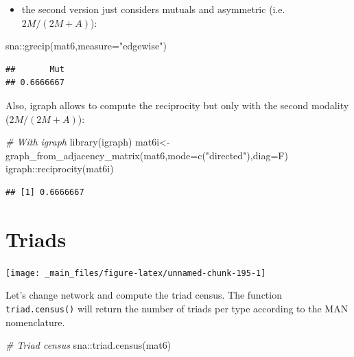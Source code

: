 \documentclass[
  notitlepage,
  onecolumn,
  openany]{book}
\newenvironment{Shaded}{\begin{snugshade}}{\end{snugshade}}
\newcommand{\AttributeTok}[1]{\textcolor[rgb]{0.77,0.63,0.00}{#1}}
\newcommand{\CommentTok}[1]{\textcolor[rgb]{0.56,0.35,0.01}{\textit{#1}}}
\newcommand{\FunctionTok}[1]{\textcolor[rgb]{0.00,0.00,0.00}{#1}}
\newcommand{\NormalTok}[1]{#1}
\newcommand{\OtherTok}[1]{\textcolor[rgb]{0.56,0.35,0.01}{#1}}
\newcommand{\SpecialCharTok}[1]{\textcolor[rgb]{0.00,0.00,0.00}{#1}}
\newcommand{\StringTok}[1]{\textcolor[rgb]{0.31,0.60,0.02}{#1}}
\providecommand{\tightlist}{%
  \setlength{\itemsep}{0pt}\setlength{\parskip}{0pt}}
\begin{document}
\begin{itemize}
\tightlist
\item
  the second version just considers mutuals and asymmetric (i.e.~\(2M/(2M+A)\)):
\end{itemize}

\begin{Shaded}
\begin{Highlighting}[]
\NormalTok{sna}\SpecialCharTok{::}\FunctionTok{grecip}\NormalTok{(mat6,}\AttributeTok{measure=}\StringTok{"edgewise"}\NormalTok{)}
\end{Highlighting}
\end{Shaded}

\begin{verbatim}
##       Mut 
## 0.6666667
\end{verbatim}

Also, igraph allows to compute the reciprocity but only with the second modality (\(2M/(2M+A)\)):

\begin{Shaded}
\begin{Highlighting}[]
\CommentTok{\# With igraph}
\FunctionTok{library}\NormalTok{(igraph)}
\NormalTok{mat6i}\OtherTok{\textless{}{-}}\FunctionTok{graph\_from\_adjacency\_matrix}\NormalTok{(mat6,}\AttributeTok{mode=}\FunctionTok{c}\NormalTok{(}\StringTok{"directed"}\NormalTok{),}\AttributeTok{diag=}\NormalTok{F)}
\NormalTok{igraph}\SpecialCharTok{::}\FunctionTok{reciprocity}\NormalTok{(mat6i)}
\end{Highlighting}
\end{Shaded}

\begin{verbatim}
## [1] 0.6666667
\end{verbatim}

\hypertarget{triads-1}{%
\section{Triads}\label{triads-1}}

\texttt{[image: \_main\_files/figure-latex/unnamed-chunk-195-1]}

Let's change network and compute the triad census. The function \texttt{triad.census()} will return the number of triads per type according to the MAN nomenclature.

\begin{Shaded}
\begin{Highlighting}[]
\CommentTok{\# Triad census}
\NormalTok{sna}\SpecialCharTok{::}\FunctionTok{triad.census}\NormalTok{(mat6)}
\end{Highlighting}
\end{Shaded}
\end{document}
